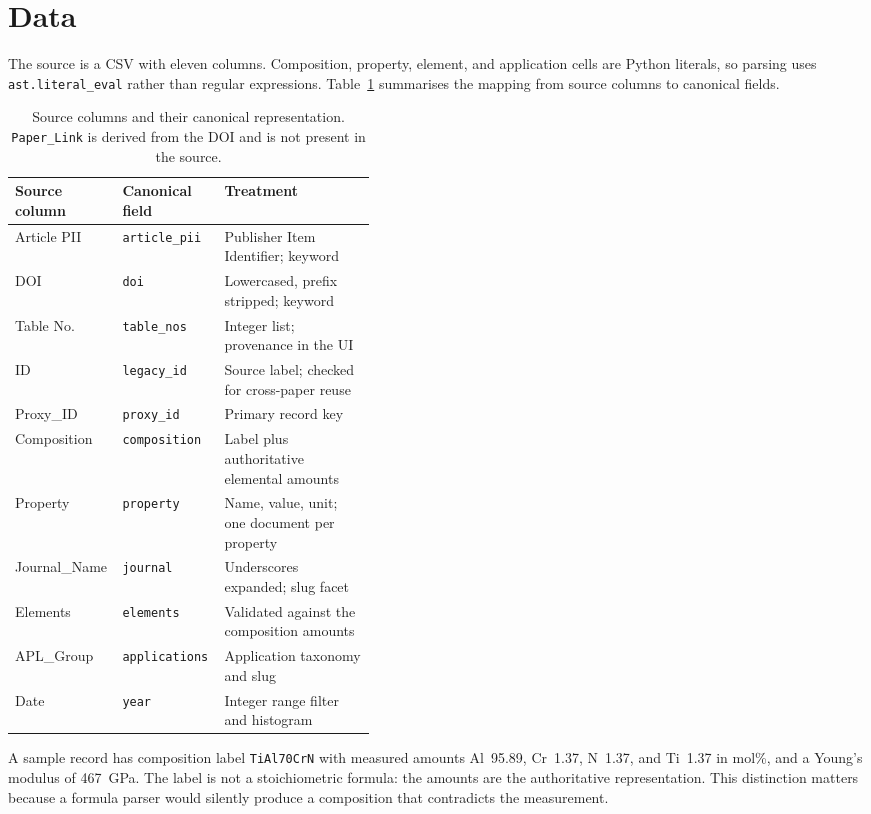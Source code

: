 \documentclass[11pt,a4paper]{article}
\begin{document}
\section{Data}

The source is a CSV with eleven columns. Composition, property, element, and
application cells are Python literals, so parsing uses \texttt{ast.literal\_eval}
rather than regular expressions. Table~\ref{tab:columns} summarises the mapping
from source columns to canonical fields.

\begin{table}[htbp]
  \centering
  \small
  \begin{tabular}{@{}llp{0.42\linewidth}@{}}
    \toprule
    Source column & Canonical field & Treatment \\
    \midrule
    Article PII & \texttt{article\_pii} & Publisher Item Identifier; keyword \\
    DOI & \texttt{doi} & Lowercased, prefix stripped; keyword \\
    Table No. & \texttt{table\_nos} & Integer list; provenance in the UI \\
    ID & \texttt{legacy\_id} & Source label; checked for cross-paper reuse \\
    Proxy\_ID & \texttt{proxy\_id} & Primary record key \\
    Composition & \texttt{composition} & Label plus authoritative elemental amounts \\
    Property & \texttt{property} & Name, value, unit; one document per property \\
    Journal\_Name & \texttt{journal} & Underscores expanded; slug facet \\
    Elements & \texttt{elements} & Validated against the composition amounts \\
    APL\_Group & \texttt{applications} & Application taxonomy and slug \\
    Date & \texttt{year} & Integer range filter and histogram \\
    \bottomrule
  \end{tabular}
  \caption{Source columns and their canonical representation. \texttt{Paper\_Link}
  is derived from the DOI and is not present in the source.}
  \label{tab:columns}
\end{table}

A sample record has composition label \texttt{TiAl70CrN} with measured amounts
Al~95.89, Cr~1.37, N~1.37, and Ti~1.37 in mol\%, and a Young's modulus of
467~GPa. The label is not a stoichiometric formula: the amounts are the
authoritative representation. This distinction matters because a formula parser
would silently produce a composition that contradicts the measurement.
\end{document}
